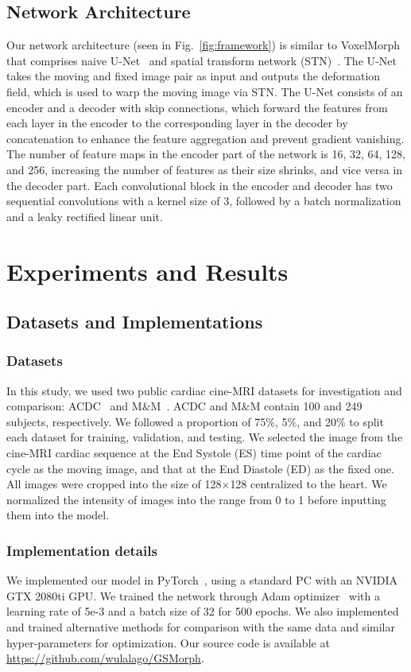 \documentclass[runningheads]{llncs}
\begin{document}
\subsection{Network Architecture}
Our network architecture (seen in Fig.~\ref{fig:framework}) is similar to VoxelMorph~\cite{dalca2018unsupervised} that comprises naive U-Net~\cite{ronneberger2015u} and spatial transform network (STN)~\cite{jaderberg2015spatial}. The U-Net takes the moving and fixed image pair as input and outputs the deformation field, which is used to warp the moving image via STN. The U-Net consists of an encoder and a decoder with skip connections, which forward the features from each layer in the encoder to the corresponding layer in the decoder by concatenation to enhance the feature aggregation and prevent gradient vanishing. The number of feature maps in the encoder part of the network is 16, 32, 64, 128, and 256, increasing the number of features as their size shrinks, and vice versa in the decoder part. Each convolutional block in the encoder and decoder has two sequential convolutions with a kernel size of 3, followed by a batch normalization and a leaky rectified linear unit. 

\section{Experiments and Results}
\subsection{Datasets and Implementations}
\subsubsection{Datasets}
In this study, we used two public cardiac cine-MRI datasets for investigation and comparison: ACDC~\cite{bernard2018deep} and M$\&$M~\cite{campello2021multi}. ACDC and M$\&$M contain 100 and 249 subjects, respectively. We followed a proportion of 75$\%$, 5$\%$, and 20$\%$ to split each dataset for training, validation, and testing. We selected the image from the cine-MRI cardiac sequence at the End Systole (ES) time point of the cardiac cycle as the moving image, and that at the End Diastole (ED) as the fixed one. All images were cropped into the size of 128$\times$128 centralized to the heart. We normalized the intensity of images into the range from 0 to 1 before inputting them into the model.

\subsubsection{Implementation details}
We implemented our model in PyTorch~\cite{paszke2019pytorch}, using a standard PC with an NVIDIA GTX 2080ti GPU. We trained the network through Adam optimizer~\cite{kingma2014adam} with a learning rate of 5e-3 and a batch size of 32 for 500 epochs. We also implemented and trained alternative methods for comparison with the same data and similar hyper-parameters for optimization. Our source code is available at \url{https://github.com/wulalago/GSMorph}.
\end{document}
